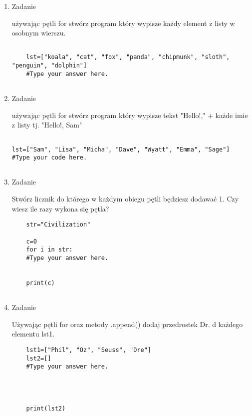 \documentclass[11pt]{article}
\begin{document}
\begin{enumerate}
\item 
\begin{Large}
	Zadanie
\end{Large}
\par
używając pętli for stwórz program który wypisze każdy element z listy w osobnym wierszu.

\begin{lstlisting}
	
	lst=["koala", "cat", "fox", "panda", "chipmunk", "sloth", "penguin", "dolphin"]
	#Type your answer here.
	
\end{lstlisting}

\item 
\begin{Large}
	Zadanie
\end{Large}
\par
używając pętli for stwórz program który wypisze tekst "Hello!,"  + każde imie z listy tj. "Hello!, Sam"

\begin{lstlisting}
	
lst=["Sam", "Lisa", "Micha", "Dave", "Wyatt", "Emma", "Sage"]
#Type your code here.
	
\end{lstlisting}

\item 
\begin{Large}
	Zadanie
\end{Large}
\par
Stwórz licznik do którego w każdym obiegu pętli będziesz dodawać 1. Czy wiesz ile razy wykona się pętla?
\begin{lstlisting}
	str="Civilization"
	
	c=0
	for i in str:
	#Type your answer here.    
	
	
	print(c)
	
\end{lstlisting}

\item 
\begin{Large}
	Zadanie
\end{Large}
\par
Używając pętli for oraz metody .append() dodaj przedrostek Dr. d każdego elementu lst1.
\begin{lstlisting}
	lst1=["Phil", "Oz", "Seuss", "Dre"]
	lst2=[]
	#Type your answer here.
	
	
	
	
	print(lst2)
\end{lstlisting}


\end{enumerate}
\end{document}

